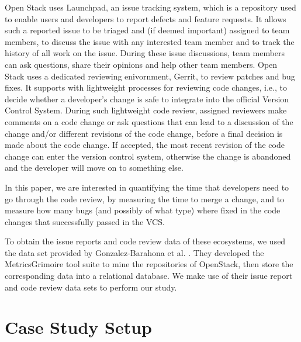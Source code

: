 \documentclass[ifip]{svmult}
\begin{document}
Open Stack uses Launchpad, an issue tracking system, which is a repository used to enable
users and developers to report defects and feature requests. It allows such a reported issue to be triaged and (if  deemed
important) assigned to team members, to discuss the issue
with any interested team member and to track the history of
all work on the issue. During these issue discussions, team
members can ask questions, share their opinions and help
other team members. Open Stack uses a dedicated reviewing enivornment, 
Gerrit, to  review  patches  and  bug  fixes. It supports with 
lightweight processes for reviewing code changes, i.e., 
to decide whether a developer’s change is safe to
integrate into the official Version Control System. During such
lightweight  code  review,  assigned  reviewers  make  comments
on a code change or ask questions that can lead to a discussion
of  the  change  and/or  different  revisions  of  the  code  change,
before  a  final  decision  is  made  about  the  code  change.  If
accepted, the most recent revision of the code change can enter
the version control system, otherwise the change is abandoned
and the developer will move on to something else.  

In this paper, we are interested in quantifying the time that developers need 
to go through the code review, by measuring the time to merge a change,
and to measure how many bugs (and possibly of what type) where fixed in the
code changes that successfully  passed in the VCS.


To obtain the issue reports and code review data of these ecosystems, we used the data set 
provided by Gonzalez-Barahona et al. \cite{contribution21}.  They  developed the  MetricsGrimoire tool suite to mine the repositories of
OpenStack, then store the corresponding data into a relational database. We make use of their issue
report and code review data sets \cite{contribution22} to perform our study.


\section{Case Study Setup}
\label{sec:4}
\end{document}
